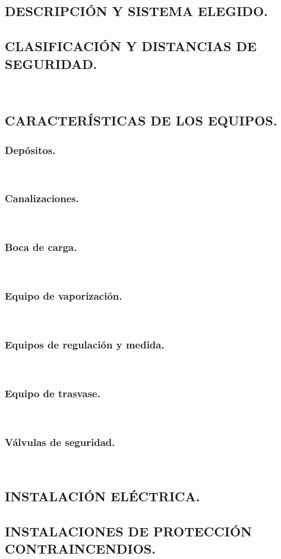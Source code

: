 \documentclass[12pt]{article}
\begin{document}
        \subsection{DESCRIPCIÓN Y SISTEMA ELEGIDO.}
        
        \subsection{CLASIFICACIÓN Y DISTANCIAS DE SEGURIDAD.}
        ~
        \subsection{CARACTERÍSTICAS DE LOS EQUIPOS.}
            \subsubsection{Depósitos.}
            ~
            \subsubsection{Canalizaciones.}
            ~
            \subsubsection{Boca de carga.}
            ~
            \subsubsection{Equipo de vaporización.}
            ~
            \subsubsection{Equipos de regulación y medida.}
            ~
            \subsubsection{Equipo de trasvase.}
            ~
            \subsubsection{Válvulas de seguridad.}
            ~
        
        \clearpage
        \subsection{INSTALACIÓN ELÉCTRICA.}
        
        
        \subsection{INSTALACIONES DE PROTECCIÓN CONTRAINCENDIOS.}
        ~
\end{document}
